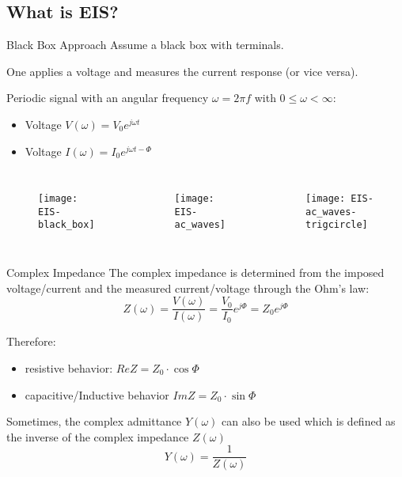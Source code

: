 \documentclass[10pt,compress,handout]{beamer}
\begin{document}
    \subsection{What is EIS?}
    \begin{frame}{Black Box Approach}
        Assume a black box with terminals.

        One applies a voltage and measures the current response (or vice versa).

        Periodic signal with an angular frequency $\omega = 2\pi f$
        with $0 \le \omega < \infty$:
        \begin{itemize}
            \item Voltage $V(\omega) = V_0 e^{j \omega t}$  
            \item Voltage $I(\omega) = I_0 e^{j \omega t - \Phi}$  
        \end{itemize}
        
        \begin{columns}
            \centering
            \centering
                \begin{figure}[h]
                    \texttt{[image: EIS-black\_box]}
                \end{figure}
            \centering
                \begin{figure}
                    \texttt{[image: EIS-ac\_waves]}
                \end{figure}
            \centering
                \begin{figure}
                    \texttt{[image: EIS-ac\_waves-trigcircle]}
                \end{figure}
        \end{columns}
    \end{frame}
    
    \begin{frame}{Complex Impedance}
        The complex impedance is determined from the imposed voltage/current and the measured
        current/voltage through the Ohm's law:
        $$ Z(\omega) = \frac{V(\omega)}{I(\omega)} = \frac{V_0}{I_0} e^{j \Phi} = Z_0 e^{j\Phi}$$

        Therefore:
        \begin{itemize}
            \item  resistive behavior: $ReZ=Z_0 \cdot \cos \Phi$
            \item  capacitive/Inductive behavior $ImZ=Z_0 \cdot \sin \Phi$
        \end{itemize}
        
        Sometimes, the complex admittance $Y(\omega)$ can also be used which is defined as the inverse of the
        complex impedance $Z(\omega)$ 
        $$Y(\omega)=\frac{1}{Z(\omega)}$$
    \end{frame}
\end{document}
